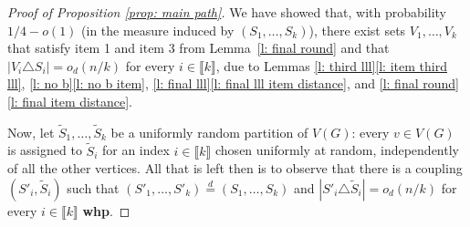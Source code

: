 \documentclass[notitlepage]{scrartcl}
\newcommand{\br}[1]{\llbracket{#1}\rrbracket}
\begin{document}
\begin{proof}[Proof of Proposition \ref{prop: main path}]
We have showed that, with probability $1/4-o(1)$ (in the measure induced by $(S_1,\ldots,S_k)$), there exist sets $V_1,\ldots,V_k$ that satisfy item 1 and item 3 from Lemma~\ref{l: final round} and that $|V_i\triangle S_i|=o_d(n/k)$ for every $i\in \br{k}$, due to Lemmas \ref{l: third lll}\eqref{l: item third lll}, \ref{l: no b}\eqref{l: no b item}, \ref{l: final lll}\eqref{l: final lll item distance}, and \ref{l: final round}\eqref{l: final item distance}. %

Now, let $\tilde{S}_1,\ldots, \tilde{S}_k$ be a uniformly random partition of $V(G)$: every $v\in V(G)$ is assigned to $\tilde{S}_i$ for an index $i\in \br{k}$ chosen uniformly at random, independently of all the other vertices. All that is left then is to observe that there is a coupling $(S'_i,\tilde S_i)$  such that $(S'_1,\ldots,S'_k)\stackrel{d}=(S_1,\ldots,S_k)$ and  $|S'_i\triangle \tilde{S}_i|=o_d(n/k)$ for every $i\in \br{k}$ \textbf{whp}. 



\end{proof}
\end{document}
